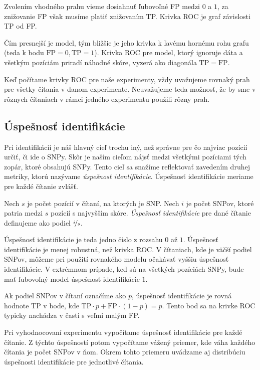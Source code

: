 Zvolením vhodného prahu vieme dosiahnuť ľubovoľné FP medzi $0$ a $1$, za znižovanie FP však musíme
platiť znižovaním TP. Krivka ROC je graf závislosti TP od FP. 


Čím presnejší je model, tým bližšie je jeho krivka k ľavému hornému rohu grafu (teda k bodu $
\mathrm{FP} = 0, \mathrm{TP} = 1$).
Krivka ROC pre model, ktorý ignoruje dáta a všetkým pozíciám priradí náhodné skóre, vyzerá ako diagonála
$\mathrm{TP} = \mathrm{FP}$.

Keď počítame krivky ROC pre naše experimenty, vždy uvažujeme rovnaký prah pre všetky čítania v danom 
experimente. Neuvažujeme teda možnosť, že by sme v rôznych čítaniach v rámci jedného experimentu použili 
rôzny prah.

\subsection{Úspešnosť identifikácie}

Pri identifikácii je náš hlavný cieľ trochu iný, než správne pre čo najviac pozícií určiť, či ide o SNPy. Skôr
je naším cieľom nájsť medzi všetkými pozíciami tých zopár, ktoré obsahujú SNPy. Tento cieľ sa snažíme 
reflektovať zavedením druhej metriky, ktorú nazývame \emph{úspešnosť identifikácie}. Úspešnosť identifikácie
meriame pre každé čítanie zvlášť.

\begin{definicia}
Nech $s$ je počet pozícií v čítaní, na ktorých je SNP. Nech $i$ je počet SNPov, ktoré patria medzi $s$ pozícií
s najvyšším skóre. \emph{Úspešnosť identifikácie} pre dané čítanie definujeme ako podiel $\nicefrac{i}{s}$.
\end{definicia}

Úspešnosť identifikácie je teda jedno číslo z rozsahu $0$ až $1$. Úspešnosť identifikácie je menej robustná,
než krivka ROC. V čítaniach, kde je väčší podiel SNPov, môžeme pri použití rovnakého modelu očakávať vyššiu úspešnosť identifikácie.
V extrémnom prípade, keď sú na všetkých pozíciách SNPy, bude mať ľubovoľný model úspešnosť identifikácie $1$.

Ak podiel SNPov v čítaní označíme ako $p$, úspešnosť identifikácie je rovná hodnote TP v bode, 
kde $\mathrm{TP} \cdot p + \mathrm{FP} \cdot (1-p) = p$. Tento bod sa na krivke ROC typicky nachádza v časti s
veľmi malým FP.

Pri vyhodnocovaní experimentu vypočítame úspešnosť identifikácie pre každé čítanie. Z týchto úspešností potom vypočítame
vážený priemer, kde váha každého čítania je počet SNPov v ňom. Okrem tohto priemeru uvádzame aj distribúciu 
úspešnosti identifikácie pre jednotlivé čítania.


